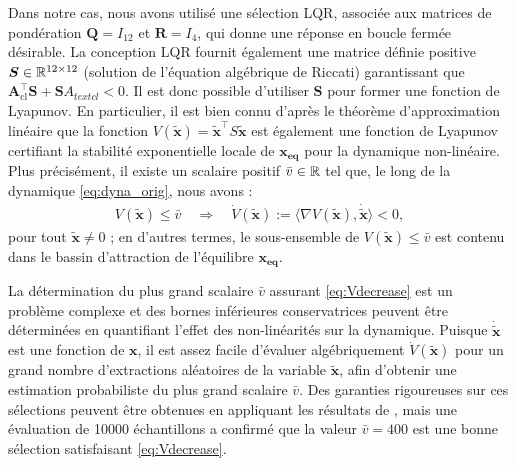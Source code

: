 Dans notre cas, nous avons utilisé une sélection LQR, associée aux matrices de pondération $\boldsymbol{Q} = I_{12}$ et $\boldsymbol{R} = I_{4}$, qui donne une réponse en boucle fermée désirable. La conception LQR fournit également une matrice définie positive  $\boldsymbol{S} \in {\mathbb R}^{12 \times 12}$ (solution de l'équation algébrique de Riccati) garantissant que $\boldsymbol{A}_{\text{cl}}^\top \boldsymbol{S} + \boldsymbol{S} A_{text{cl}} <0$. Il est donc possible d'utiliser $\boldsymbol{S}$ pour former une fonction de Lyapunov.  En particulier, il est bien connu d'après le théorème d'approximation linéaire que la fonction $V(\boldsymbol{\tilde x}) = \boldsymbol{\tilde x}^\top S \boldsymbol{\tilde x}$ est également une fonction de Lyapunov certifiant la stabilité exponentielle locale de $\boldsymbol{x_{\text{eq}}}$ pour la dynamique non-linéaire. Plus précisément, il existe un scalaire positif $\bar v \in {\mathbb R}$ tel que, le long de la dynamique \eqref{eq:dyna_orig}, nous avons :
\begin{align}
\label{eq:Vdecrease}
  V(\boldsymbol{\tilde x}) \leq \bar v \quad \Rightarrow \quad \dot V(\boldsymbol{\tilde x}) := \langle 
\nabla V(\boldsymbol{\tilde x}), \boldsymbol{\dot{\tilde x}}\rangle <0,
\end{align}
pour tout $\boldsymbol{\tilde x} \neq 0$ ; en d'autres termes, le sous-ensemble de $V(\boldsymbol{\tilde x}) \leq \bar v$ est contenu dans le bassin d'attraction de l'équilibre $\boldsymbol{x_{\text{eq}}}$.

La détermination du plus grand scalaire $\bar v$ assurant \eqref{eq:Vdecrease} est un problème complexe et des bornes inférieures conservatrices peuvent être déterminées en quantifiant l'effet des non-linéarités sur la dynamique. Puisque $\boldsymbol{\dot{\tilde x}}$ est une fonction de $\boldsymbol{x}$, il est assez facile d'évaluer algébriquement $\dot V(\boldsymbol{\tilde x})$ pour un grand nombre d'extractions aléatoires de la variable $\boldsymbol{\tilde x}$, afin d'obtenir une estimation probabiliste du plus grand scalaire $\bar v$. Des garanties rigoureuses sur ces sélections peuvent être obtenues en appliquant les résultats de \cite{tempo2013randomized}, mais une évaluation de 10000 échantillons a confirmé que la valeur $\bar v = 400$ est une bonne sélection satisfaisant \eqref{eq:Vdecrease}.


